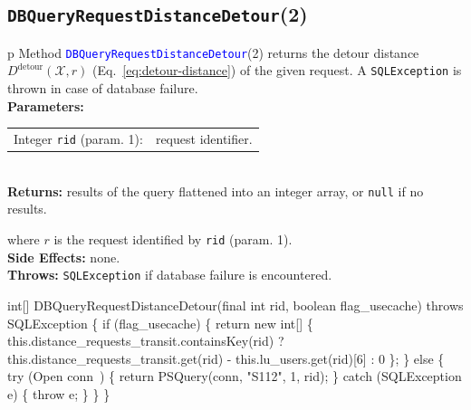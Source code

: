 \subsection{\texttt{DBQueryRequestDistanceDetour}(2)}
\begin{tabular}{p{\textwidth}}
\toprule
{}
Method \textcolor{blue}{{\tt{}\protect{}DBQueryRequestDistanceDetour}}(2) returns the
detour distance $D^\textrm{detour}(\mathcal{X},r)$
(Eq.~\ref{eq:detour-distance}) of the given request.
A {\tt{}SQLException} is thrown in case of database failure.\\
\midrule
\textbf{Parameters:}\\
\begin{tabular}{lp{116mm}}
Integer {\tt{}rid} (param. 1):&request identifier.
\end{tabular}\\
\textbf{Returns:} results of the query flattened into an integer array,
or {\tt{}null} if no results.


where $r$ is the request identified by {\tt{}rid} (param. 1).\\
\textbf{Side Effects:} none.\\
\textbf{Throws:} {\tt{}SQLException} if database failure is encountered.\\
\bottomrule
\end{tabular}
\nwenddocs{}\endmoddef{}
int[] DBQueryRequestDistanceDetour(final int rid, boolean flag_usecache) throws SQLException \{
  if (flag_usecache) \{
    return new int[] \{ this.distance_requests_transit.containsKey(rid)
      ? this.distance_requests_transit.get(rid) - this.lu_users.get(rid)[6]
      : 0 \};
  \} else \{
    try (\LA{}Open \code{}conn\edoc{}~{\nwtagstyle{}}\RA{}) \{
      return PSQuery(conn, "S112", 1, rid);
    \} catch (SQLException e) \{
      throw e;
    \}
  \}
\}
\eatline
{}\nwendcode{}\nwdocspar
